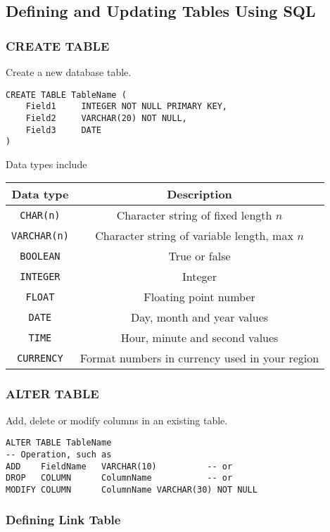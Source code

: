 \subsection{Defining and Updating Tables Using SQL}

\subsubsection*{CREATE TABLE}
Create a new database table.
\begin{verbatim}
CREATE TABLE TableName (
    Field1     INTEGER NOT NULL PRIMARY KEY,
    Field2     VARCHAR(20) NOT NULL,
    Field3     DATE
)
\end{verbatim}

Data types include
\begin{center}
    \begin{tabular}{|c|c|}
        \hline
        Data type & Description\\
        \hline
        \texttt{CHAR(n)} & Character string of fixed length $n$\\
        \texttt{VARCHAR(n)} & Character string of variable length, max $n$\\
        \texttt{BOOLEAN} & True or false\\
        \texttt{INTEGER} & Integer\\
        \texttt{FLOAT} & Floating point number\\
        \texttt{DATE} & Day, month and year values\\
        \texttt{TIME} & Hour, minute and second values\\
        \texttt{CURRENCY} & Format numbers in currency used in your region\\
        \hline
    \end{tabular}
\end{center}

\subsubsection*{ALTER TABLE}
Add, delete or modify columns in an existing table.
\begin{verbatim}
ALTER TABLE TableName
-- Operation, such as
ADD    FieldName   VARCHAR(10)          -- or
DROP   COLUMN      ColumnName           -- or
MODIFY COLUMN      ColumnName VARCHAR(30) NOT NULL
\end{verbatim}

\subsubsection*{Defining Link Table}

